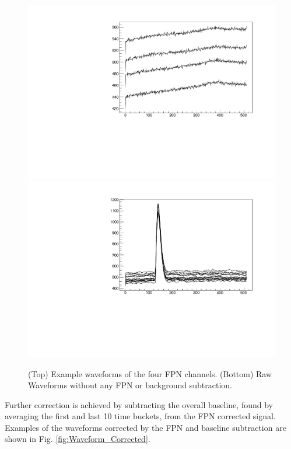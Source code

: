 \documentclass[final,number,sort&compress,5p,times,twocolumn]{elsarticle}
\begin{document}
\begin{figure}[hbt!]
  	\includegraphics[width=1.0\columnwidth]{figures/fpnChannels}
         \includegraphics[width=1.0\columnwidth]{figures/waveformRaw}
	\caption{(Top) Example waveforms of the four FPN channels. (Bottom) Raw Waveforms without any FPN or background subtraction.}
	\label{fig:FPN_Raw}
\end{figure}

Further correction is achieved by subtracting the overall baseline, found by averaging the first and last 10 time buckets, from the FPN corrected signal. Examples of the waveforms corrected by the FPN and baseline subtraction are shown in Fig. \ref{fig:Waveform_Corrected}.
\end{document}
